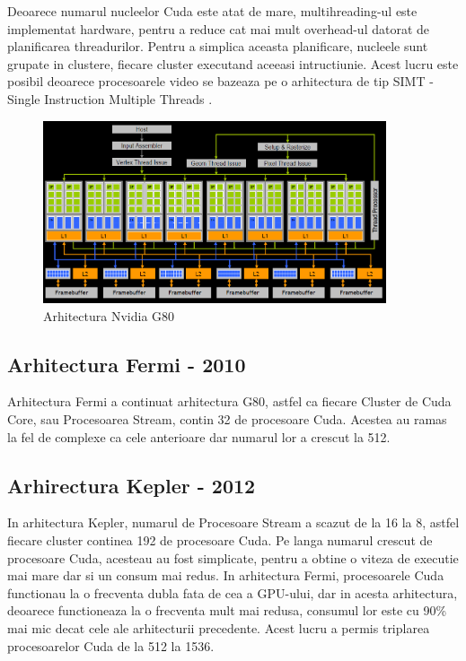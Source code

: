 Deoarece numarul nucleelor Cuda este atat de mare, multihreading-ul este implementat hardware,
pentru a reduce cat mai mult overhead-ul datorat de planificarea threadurilor. Pentru a simplica
aceasta planificare, nucleele sunt grupate in clustere, fiecare cluster executand aceeasi
intructiunie. Acest lucru este posibil deoarece procesoarele video se bazeaza pe o arhitectura de tip SIMT - Single Instruction Multiple Threads \cite{luebke2008gpu}.

\begin{figure}[ht] \centering
\includegraphics[width=0.9\textwidth]{img/g80.png}
\caption{Arhitectura Nvidia G80} \end{figure}


\subsection{Arhitectura Fermi - 2010}

Arhitectura Fermi a continuat arhitectura G80, astfel ca fiecare Cluster de Cuda Core, sau Procesoarea Stream,
contin 32 de procesoare Cuda. Acestea au ramas la fel de complexe ca cele anterioare dar
numarul lor a crescut la 512.

\subsection{Arhirectura Kepler - 2012}

In arhitectura Kepler, numarul de Procesoare Stream a scazut de la 16 la 8, astfel fiecare cluster
continea 192 de procesoare Cuda. Pe langa numarul crescut de procesoare Cuda, acesteau au fost
simplicate, pentru a obtine o viteza de executie mai mare dar si un consum mai redus. In
arhitectura Fermi, procesoarele Cuda functionau la o frecventa dubla fata de cea a GPU-ului, dar in
acesta arhitectura, deoarece functioneaza la o frecventa mult mai redusa, consumul lor este cu 90\%
mai mic decat cele ale arhitecturii precedente. Acest lucru a permis triplarea procesoarelor Cuda de la 512 la 1536.

